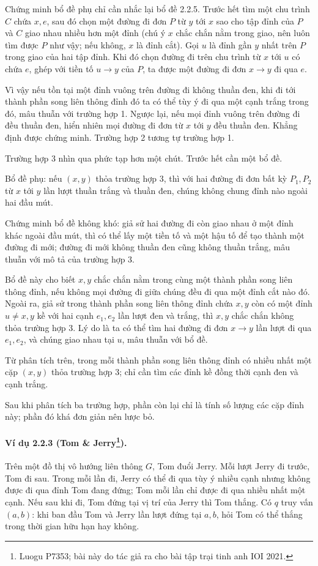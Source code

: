 \documentclass[11pt]{article}
\renewcommand{\leadsto}{\mathrel{\longrightarrow}}
\begin{document}
Chứng minh bổ đề phụ chỉ cần nhắc lại bổ đề 2.2.5. Trước hết tìm một chu trình
$C$ chứa $x,e$, sau đó chọn một đường đi đơn $P$ từ $y$ tới $x$ sao cho tập đỉnh
của $P$ và $C$ giao nhau nhiều hơn một đỉnh (chú ý $x$ chắc chắn nằm trong giao,
nên luôn tìm được $P$ như vậy; nếu không, $x$ là đỉnh cắt). Gọi $u$ là đỉnh gần
$y$ nhất trên $P$ trong giao của hai tập đỉnh. Khi đó chọn đường đi trên chu
trình từ $x$ tới $u$ có chứa $e$, ghép với tiền tố $u\leadsto y$ của $P$, ta
được một đường đi đơn $x\leadsto y$ đi qua $e$.

Vì vậy nếu tồn tại một đỉnh vuông trên đường đi không thuần đen, khi đi tới
thành phần song liên thông đỉnh đó ta có thể tùy ý đi qua một cạnh trắng trong
đó, mâu thuẫn với trường hợp 1. Ngược lại, nếu mọi đỉnh vuông trên đường đi đều
thuần đen, hiển nhiên mọi đường đi đơn từ $x$ tới $y$ đều thuần đen. Khẳng định
được chứng minh. Trường hợp 2 tương tự trường hợp 1.

Trường hợp 3 nhìn qua phức tạp hơn một chút. Trước hết cần một bổ đề.

Bổ đề phụ: nếu $(x,y)$ thỏa trường hợp 3, thì với hai đường đi đơn bất kỳ
$P_1,P_2$ từ $x$ tới $y$ lần lượt thuần trắng và thuần đen, chúng không chung
đỉnh nào ngoài hai đầu mút.

Chứng minh bổ đề không khó: giả sử hai đường đi còn giao nhau ở một đỉnh khác
ngoài đầu mút, thì có thể lấy một tiền tố và một hậu tố để tạo thành một đường
đi mới; đường đi mới không thuần đen cũng không thuần trắng, mâu thuẫn với mô
tả của trường hợp 3.

Bổ đề này cho biết $x,y$ chắc chắn nằm trong cùng một thành phần song liên thông
đỉnh, nếu không mọi đường đi giữa chúng đều đi qua một đỉnh cắt nào đó. Ngoài
ra, giả sử trong thành phần song liên thông đỉnh chứa $x,y$ còn có một đỉnh
$u\ne x,y$ kề với hai cạnh $e_1,e_2$ lần lượt đen và trắng, thì $x,y$ chắc chắn
không thỏa trường hợp 3. Lý do là ta có thể tìm hai đường đi đơn $x\leadsto y$
lần lượt đi qua $e_1,e_2$, và chúng giao nhau tại $u$, mâu thuẫn với bổ đề.

Từ phân tích trên, trong mỗi thành phần song liên thông đỉnh có nhiều nhất một
cặp $(x,y)$ thỏa trường hợp 3; chỉ cần tìm các đỉnh kề đồng thời cạnh đen và
cạnh trắng.

Sau khi phân tích ba trường hợp, phần còn lại chỉ là tính số lượng các cặp đỉnh
này; phần đó khá đơn giản nên lược bỏ.

\paragraph{Ví dụ 2.2.3 (Tom \& Jerry\protect\footnote{Luogu P7353; bài này do tác giả ra cho bài tập trại tinh anh IOI 2021.}).}
Trên một đồ thị vô hướng liên thông $G$, Tom đuổi Jerry. Mỗi lượt Jerry đi
trước, Tom đi sau. Trong mỗi lần đi, Jerry có thể đi qua tùy ý nhiều cạnh nhưng
không được đi qua đỉnh Tom đang đứng; Tom mỗi lần chỉ được đi qua nhiều nhất một
cạnh. Nếu sau khi đi, Tom đứng tại vị trí của Jerry thì Tom thắng. Có $q$ truy
vấn $(a,b)$: khi ban đầu Tom và Jerry lần lượt đứng tại $a,b$, hỏi Tom có thể
thắng trong thời gian hữu hạn hay không.
\end{document}
